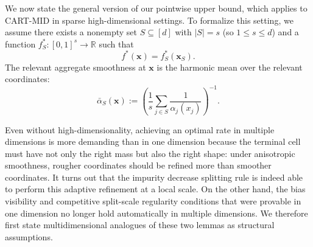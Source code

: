 \documentclass[11pt]{article}
\theoremstyle{plain}
\theoremstyle{definition}
\theoremstyle{remark}
\theoremstyle{plain}
\newcommand{\bx}{\mathbf{x}}
\newcommand{\1}{\mathbbm{1}}
\begin{document}


We now state the general version of our pointwise upper bound, which applies to CART-MID in sparse high-dimensional settings.
To formalize this setting, we assume there exists a nonempty set $S\subseteq[d]$ with $|S|=s$ (so $1\le s\le d$) and a function $f_S^*:[0,1]^s\to\mathbb R$ such that
\begin{equation} \label{eq:sparsity-set}
f^*(\bx)=f_S^*(\bx_S).
\end{equation}
The relevant aggregate smoothness at $\bx$ is the harmonic mean over the relevant coordinates:
\[
\bar\alpha_S(\bx)
:=
\left(
\frac{1}{s}\sum_{j\in S}\frac{1}{\alpha_j(x_j)}
\right)^{-1}.
\]

Even without high-dimensionality, achieving an optimal rate in multiple dimensions is more demanding than in one dimension because the terminal cell must have not only the right mass but also the right shape: under anisotropic smoothness, rougher coordinates should be refined more than smoother coordinates.
It turns out that the impurity decrease splitting rule is indeed able to perform this adaptive refinement at a local scale.
On the other hand, the bias visibility and competitive split-scale regularity conditions that were provable in one dimension no longer hold automatically in multiple dimensions.
We therefore first state multidimensional analogues of these two lemmas as structural assumptions.

\end{document}
